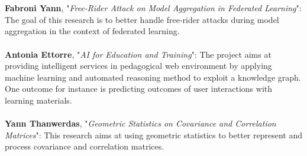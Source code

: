 \documentclass[a4paper]{article}
\begin{document}
\\\\
\textbf{Fabroni Yann}, "\textit{Free-Rider Attack on Model Aggregation in Federated Learning}": The goal of this research is to better handle free-rider attacks during model aggregation in the context of federated learning.
\\\\
\textbf{Antonia Ettorre}, "\textit{AI for Education and Training}": The project aims at providing intelligent services in pedagogical web environment by applying machine learning and automated reasoning method to exploit a knowledge graph. One outcome for instance is predicting outcomes of user interactions with learning materials.
\\\\
\textbf{Yann Thanwerdas}, "\textit{Geometric Statistics on Covariance and Correlation Matrices}": This research aims at using geometric statistics to better represent and process covariance and correlation matrices.
\end{document}

